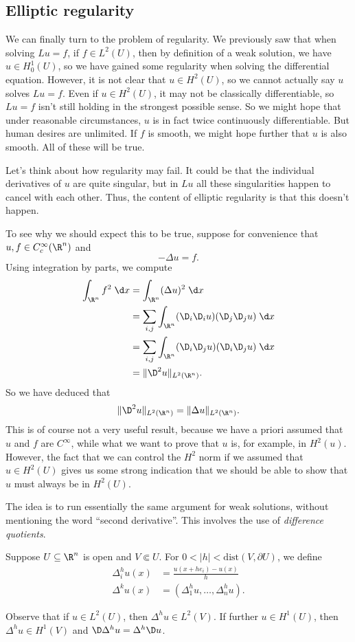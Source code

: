 \documentclass[a4paper]{article}
\begin{document}
\subsection{Elliptic regularity}
We can finally turn to the problem of regularity. We previously saw that when solving $Lu = f$, if $f \in L^2(U)$, then by definition of a weak solution, we have $u \in H_0^1(U)$, so we have gained some regularity when solving the differential equation. However, it is not clear that $u \in H^2(U)$, so we cannot actually say $u$ solves $Lu = f$. Even if $u \in H^2(U)$, it may not be classically differentiable, so $Lu = f$ isn't still holding in the strongest possible sense. So we might hope that under reasonable circumstances, $u$ is in fact twice continuously differentiable. But human desires are unlimited. If $f$ is smooth, we might hope further that $u$ is also smooth. All of these will be true.

Let's think about how regularity may fail. It could be that the individual derivatives of $u$ are quite singular, but in $Lu$ all these singularities happen to cancel with each other. Thus, the content of elliptic regularity is that this doesn't happen.

To see why we should expect this to be true, suppose for convenience that $u, f \in C_c^\infty(\R^n)$ and
\[
  -\Delta u = f.
\]
Using integration by parts, we compute
\begin{align*}
  \int_{\R^n} f^2 \;\d x &= \int_{\R^n} (\Delta u)^2\;\d x \\
  &= \sum_{i, j} \int_{\R^n} (\D_i \D_i u) (\D_j \D_j u)\;\d x\\
  &= \sum_{i ,j} \int_{\R^n} (\D_i \D_j u) (\D_i \D_j u) \;\d x\\
  &= \|\D^2 u\|_{L^2(\R^n)}.
\end{align*}
So we have deduced that
\[
  \|\D^2 u\|_{L^2(\R^n)} = \| \Delta u\|_{L^2(\R^n)}.
\]
This is of course not a very useful result, because we have a priori assumed that $u$ and $f$ are $C^\infty$, while what we want to prove that $u$ is, for example, in $H^2(u)$. However, the fact that we can control the $H^2$ norm if we assumed that $u \in H^2(U)$ gives us some strong indication that we should be able to show that $u$ must always be in $H^2(U)$.

The idea is to run essentially the same argument for weak solutions, without mentioning the word ``second derivative''. This involves the use of \emph{difference quotients}.

\begin{defi}
  Suppose $U \subseteq \R^n$ is open and $V \Subset U$. For $0 < |h| < \mathrm{dist}(V, \partial U)$, we define
  \begin{align*}
    \Delta_i^h u(x) &= \frac{u(x + h e_i) - u(x)}{h}\\
    \Delta^k u(x) &= (\Delta_1^h u, \ldots, \Delta^h_n u).
  \end{align*}
\end{defi}
Observe that if $u \in L^2(U)$, then $\Delta^h u \in L^2(V)$. If further $u \in H^1(U)$, then $\Delta^h u \in H^1(V)$ and $\D \Delta^h u = \Delta^h \D u$.
\end{document}
